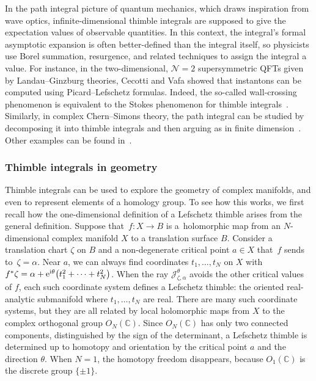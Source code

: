 \documentclass[10pt,a4paper]{amsart}
\newcommand{\maps}{\colon}
\newcommand{\C}{\mathbb{C}}
\numberwithin{equation}{section}
\begin{document}
In the path integral picture of quantum mechanics, which draws inspiration from wave optics, infinite-dimensional thimble integrals are supposed to give the expectation values of observable quantities. In this context, the integral's formal asymptotic expansion is often better-defined than the integral itself, so physicists use Borel summation, resurgence, and related techniques to assign the integral a value. For instance, in the two-dimensional, $\mathcal{N}=2$ supersymmetric QFTs given by Landau--Ginzburg theories, Cecotti and Vafa showed that instantons can be computed using Picard--Lefschetz formulas. Indeed, the so-called wall-crossing phenomenon is equivalent to the Stokes phenomenon for thimble integrals~\cite{Cecotti:1992rm}. Similarly, in complex Chern--Simons theory, the path integral can be studied by decomposing it into thimble integrals and then arguing as in finite dimension~\cite{gukov-marino-purtrov-resurgence,Witten}. Other examples can be found in~\cite{Unsal--resurgence-gauge,dunne-unsal2,Berry1991,Berry_Howls,costin_kruskal,dunne-unsal,Fauvet_Menous_Queva,Garoufalidis--CS,GGM,GTM--CS,Howls,Howls97,pham1988resurgence,Tanizaki:2014tua}.
%
\subsubsection{Thimble integrals in geometry}
Thimble integrals can be used to explore the geometry of complex manifolds, and even to represent elements of a homology group. To see how this works, we first recall how the one-dimensional definition of a Lefschetz thimble arises from the general definition. Suppose that~${f \maps X \to B}$ is a~holomorphic map from an $N$-dimensional complex manifold $X$ to a translation surface $B$. Consider a translation chart $\zeta$ on $B$ and a non-degenerate critical point $a \in X$ that~$f$ sends to~${\zeta = \alpha}$. Near $a$, we can always find coordinates $t_1, \dots, t_N$ on $X$ with
$ f^*\zeta = \alpha + {\rm e}^{{\rm i} \theta} \bigl(t_1^2 + \cdots + t_N^2\bigr)$.
When the ray $\mathcal{J}_{\zeta, \alpha}^\theta$ avoids the other critical values of $f$, each such coordinate system defines a Lefschetz thimble: the oriented real-analytic submanifold where $t_1, \dots, t_N$ are real. There are many such coordinate systems, but they are all related by local holomorphic maps from $X$ to the complex orthogonal group $O_N(\C)$. Since $O_N(\C)$ has only two connected components, distinguished by the sign of the determinant, a Lefschetz thimble is determined up to homotopy and orientation by the critical point $a$ and the direction $\theta$. When $N = 1$, the homotopy freedom disappears, because $O_1(\C)$ is the discrete group $\{\pm 1\}$.
\end{document}
